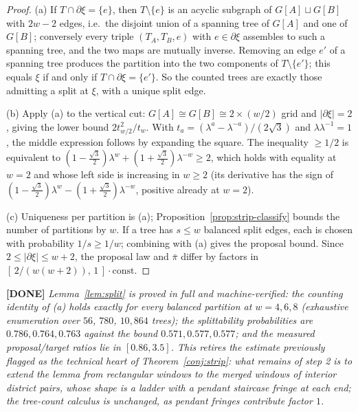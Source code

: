 \documentclass[11pt]{article}
\newcommand{\done}[1]{\medskip\noindent\textcolor{donecol}{\textbf{[DONE]} \emph{#1}}\medskip}
\begin{document}
\begin{proof}
(a) If $T \cap \partial\xi = \{e\}$, then $T \setminus \{e\}$ is an acyclic
subgraph of $G[A] \sqcup G[B]$ with $2w - 2$ edges, i.e.\ the disjoint union
of a spanning tree of $G[A]$ and one of $G[B]$; conversely every triple
$(T_A, T_B, e)$ with $e \in \partial\xi$ assembles to such a spanning tree,
and the two maps are mutually inverse. Removing an edge $e'$ of a spanning
tree produces the partition into the two components of $T \setminus \{e'\}$;
this equals $\xi$ if and only if $T \cap \partial\xi = \{e'\}$. So the
counted trees are exactly those admitting a split at $\xi$, with a unique
split edge.

(b) Apply (a) to the vertical cut: $G[A] \cong G[B] \cong 2 \times (w/2)$
grid and $|\partial\xi| = 2$, giving the lower bound $2 t_{w/2}^2 / t_w$.
With $t_a = (\lambda^a - \lambda^{-a})/(2\sqrt3)$ and
$\lambda \lambda^{-1} = 1$, the middle expression follows by expanding the
square. The inequality $\ge 1/2$ is equivalent to
$(1 - \tfrac{\sqrt3}{2})\lambda^w + (1 + \tfrac{\sqrt3}{2})\lambda^{-w}
\ge 2$, which holds with equality at $w = 2$ and whose left side is
increasing in $w \ge 2$ (its derivative has the sign of
$(1 - \tfrac{\sqrt3}{2})\lambda^w - (1 + \tfrac{\sqrt3}{2})\lambda^{-w}$,
positive already at $w = 2$).

(c) Uniqueness per partition is (a); Proposition~\ref{prop:strip-classify}
bounds the number of partitions by $w$. If a tree has $s \le w$ balanced
split edges, each is chosen with probability $1/s \ge 1/w$; combining with
(a) gives the proposal bound. Since $2 \le |\partial\xi| \le w + 2$, the
proposal law and $\bar\pi$ differ by factors in
$[\,2/(w(w+2)),\, 1\,] \cdot \mathrm{const}$.
\end{proof}

\done{Lemma~\ref{lem:split} is proved in full and machine-verified: the
counting identity of (a) holds exactly for every balanced partition at
$w = 4, 6, 8$ (exhaustive enumeration over $56$, $780$, $10{,}864$ trees);
the splittability probabilities are $0.786, 0.764, 0.763$ against the
bound $0.571, 0.577, 0.577$; and the measured proposal/target ratios lie
in $[0.86, 3.5]$. This retires the estimate previously flagged as the
technical heart of Theorem~\ref{conj:strip}: what remains of step 2 is
to extend the lemma from rectangular windows to the merged windows of
\emph{interior} district pairs, whose shape is a ladder with a pendant
staircase fringe at each end; the tree-count calculus is unchanged, as
pendant fringes contribute factor $1$.}
\end{document}
